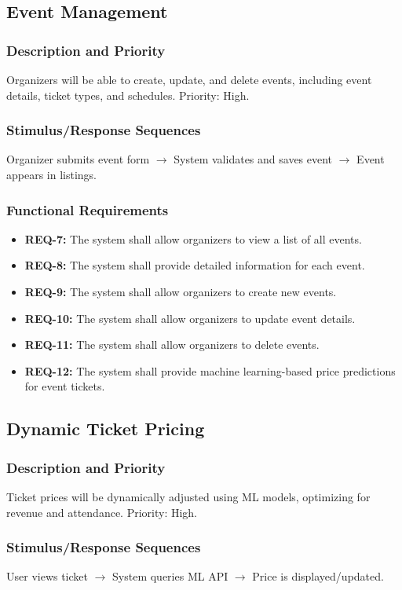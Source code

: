 \documentclass[11pt,a4paper]{article}
\begin{document}
\subsection{Event Management}
\subsubsection{Description and Priority}
Organizers will be able to create, update, and delete events, including event details, ticket types, and schedules. Priority: High.
\subsubsection{Stimulus/Response Sequences}
Organizer submits event form $\rightarrow$ System validates and saves event $\rightarrow$ Event appears in listings.
\subsubsection{Functional Requirements}
\begin{itemize}
    \item \textbf{REQ-7:} The system shall allow organizers to view a list of all events.
    \item \textbf{REQ-8:} The system shall provide detailed information for each event.
    \item \textbf{REQ-9:} The system shall allow organizers to create new events.
    \item \textbf{REQ-10:} The system shall allow organizers to update event details.
    \item \textbf{REQ-11:} The system shall allow organizers to delete events.
    \item \textbf{REQ-12:} The system shall provide machine learning-based price predictions for event tickets.
\end{itemize}

\subsection{Dynamic Ticket Pricing}
\subsubsection{Description and Priority}
Ticket prices will be dynamically adjusted using ML models, optimizing for revenue and attendance. Priority: High.
\subsubsection{Stimulus/Response Sequences}
User views ticket $\rightarrow$ System queries ML API $\rightarrow$ Price is displayed/updated.
\end{document}
